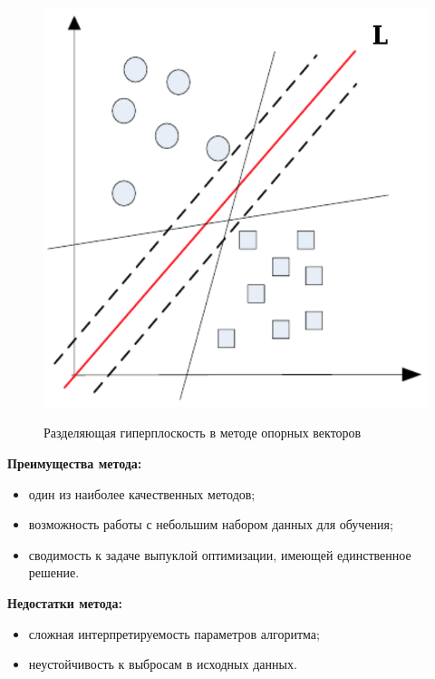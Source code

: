 \documentclass[utf8x, 14pt, oneside, a4paper]{article}
\begin{document}
	\begin{figure}[h!]
		\begin{center}
			{\includegraphics[scale = 0.6]{img/svm.png}}
		\end{center}
		\caption{Разделяющая гиперплоскость в методе опорных векторов}
		\label{ris:svm}
	\end{figure}

	\begin{flushleft}
		{\bf Преимущества метода:}
	\end{flushleft}

	\begin{itemize}
		\item один из наиболее качественных методов;
		\item возможность работы с небольшим набором данных для обучения;
		\item сводимость к задаче выпуклой оптимизации, имеющей единственное решение.
	\end{itemize}

	\begin{flushleft}
		{\bf Недостатки метода:}
	\end{flushleft}

	\begin{itemize}
		\item сложная интерпретируемость параметров алгоритма;
		\item неустойчивость к выбросам в исходных данных.
	\end{itemize}
\end{document}
